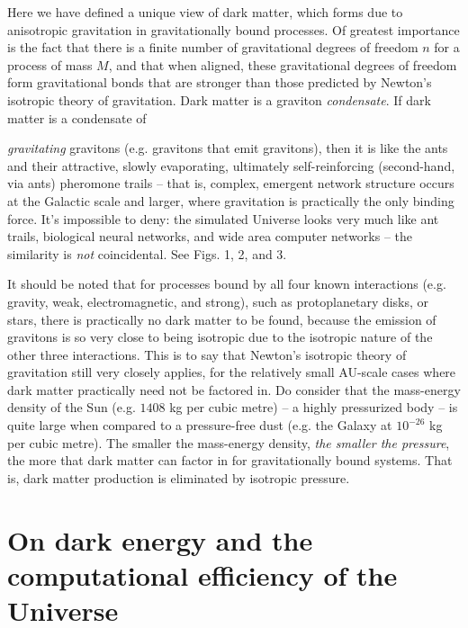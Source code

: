 \documentclass[12pt]{article}
\begin{document}
Here we have defined a unique view of dark matter, which forms due to anisotropic gravitation in gravitationally bound processes.
Of greatest importance is the fact that there is a finite number of gravitational degrees of freedom $n$ for a process of mass $M$, and that when aligned, these gravitational degrees of freedom form gravitational bonds that are stronger than those predicted by Newton's isotropic theory of gravitation.
Dark matter is a graviton {\textit{condensate}}.
If dark matter is a condensate of {\textit{gravitating} gravitons (e.g. gravitons that emit gravitons), then it is like the ants and their attractive, slowly evaporating, ultimately self-reinforcing (second-hand, via ants) pheromone trails -- that is, complex, emergent network structure occurs at the Galactic scale and larger, where gravitation is practically the only binding force.
It's impossible to deny: the simulated Universe looks very much like ant trails, biological neural networks, and wide area computer networks -- the similarity is {\textit{not}} coincidental.
See Figs. 1, 2, and 3.

It should be noted that for processes bound by all four known interactions (e.g. gravity, weak, electromagnetic, and strong), such as protoplanetary disks, or stars, there is practically no dark matter to be found, because the emission of gravitons is so very close to being isotropic due to the isotropic nature of the other three interactions.
This is to say that Newton's isotropic theory of gravitation still very closely applies, for the relatively small AU-scale cases where dark matter practically need not be factored in.
Do consider that the mass-energy density of the Sun (e.g. $1408$ kg per cubic metre) -- a highly pressurized body -- is quite large when compared to a pressure-free dust (e.g. the Galaxy at $10^{-26}$ kg per cubic metre).
The smaller the mass-energy density, {\textit{the smaller the pressure}}, the more that dark matter can factor in for gravitationally bound systems.
That is, dark matter production is eliminated by isotropic pressure.



\section{On dark energy and the computational efficiency of the Universe}

}
\end{document}
